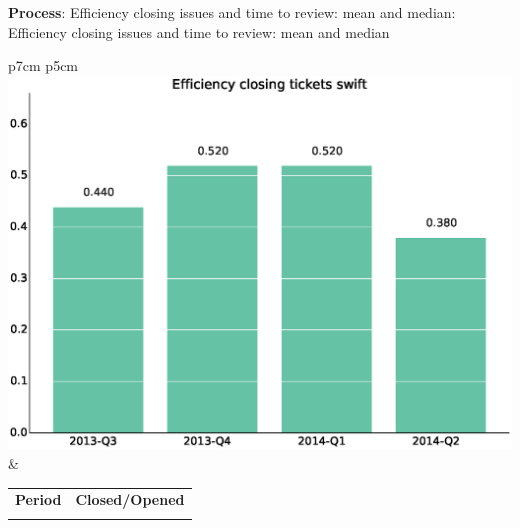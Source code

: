 \documentclass[a4wide,11pt]{report}
\begin{document}
\textbf{Process}: Efficiency closing issues and time to review: mean and median: Efficiency closing issues and time to review: mean and median

\begin{tabular}{p{7cm} p{5cm}}
    \vspace{0pt} 
    \includegraphics[scale=.35]{figs/bmiswift.eps}
    & 
    \vspace{0pt}
    \begin{tabular}{l|l}%
    \bfseries Period & \bfseries Closed/Opened %
    \csvreader[head to column names]{data/bmiswift.csv}{}%
    {\\ & \bmi}
    \end{tabular}
\end{tabular}
\end{document}
